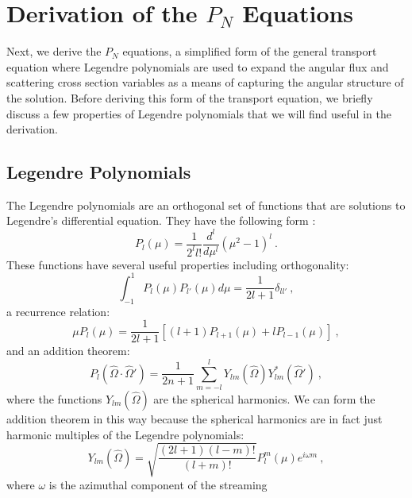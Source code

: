 \section{Derivation of the $P_N$ Equations}
\label{sec:pn_equations}
Next, we derive the $P_N$ equations, a simplified form of the general
transport equation where Legendre polynomials are used to expand the
angular flux and scattering cross section variables as a means of
capturing the angular structure of the solution. Before deriving this
form of the transport equation, we briefly discuss a few properties of
Legendre polynomials that we will find useful in the derivation.

\subsection{Legendre Polynomials}
\label{subsec:legendre_polys}
The Legendre polynomials are an orthogonal set of functions that
are solutions to Legendre's differential equation. They have the
following form \citep{lewis_computational_1993}:
\begin{equation}
  P_l(\mu) = \frac{1}{2^l l!}\frac{d^l}{d \mu^l}(\mu^2-1)^l\:.
  \label{eq:general_legendre_poly}
\end{equation}
These functions have several useful properties including
orthogonality:
\begin{equation}
  \int_{-1}^{1} P_l(\mu) P_{l'}(\mu) d\mu = \frac{1}{2l+1}\delta_{l l'}\:,
  \label{eq:legendre_orthog}
\end{equation}
a recurrence relation:
\begin{equation}
  \mu P_l(\mu) = \frac{1}{2l+1}[(l+1)P_{l+1}(\mu) + l P_{l-1}(\mu)]\:,
  \label{eq:legendre_recurrence}
\end{equation}
and an addition theorem:
\begin{equation}
  P_l(\hat{\Omega} \cdot \hat{\Omega}') = \frac{1}{2n+1}\sum_{m=-l}^l
  Y_{lm}(\hat{\Omega})Y^*_{lm}(\hat{\Omega}')\:,
  \label{eq:legendre_addition}
\end{equation}
where the functions $Y_{lm}(\hat{\Omega})$ are the spherical
harmonics. We can form the addition theorem in this way because the
spherical harmonics are in fact just harmonic multiples of the
Legendre polynomials:
\begin{equation}
  Y_{lm}(\hat{\Omega}) =
  \sqrt{\frac{(2l+1)(l-m)!}{(l+m)!}}P^m_l(\mu)e^{i \omega m}\:,
  \label{eq:spherical_harmonic}
\end{equation}
where $\omega$ is the azimuthal component of the streaming
